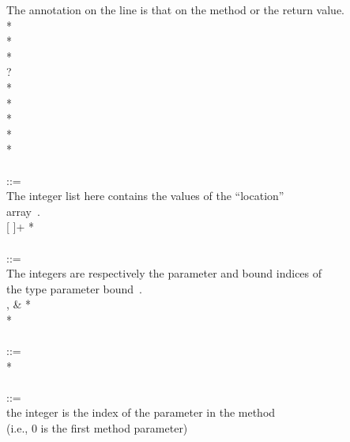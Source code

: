 \documentclass{article}
\begin{document}
\begin{tabbing}
\qquad    \bnfcmt The annotation on the  line is that on the method or the return value. \\
\qquad    {}  \bnflit{:} * \lineend \\
\qquad        {}* \\
\qquad        {}* \\
\qquad        {}? \\
\qquad        {}* \\
\qquad        {}* \\
\qquad        {}* \\
\qquad        {}* \\
\qquad        {}* \\
\\
 ::= \\
\qquad    \bnfcmt The integer list here contains the values of the ``location'' \\
\qquad    \bnfcmt array~\cite{JSR308}. \\
\qquad    {}  [ \bnflit{,}  ]+ \bnflit{:} * \lineend \\
\\
 ::= \\
\qquad    \bnfcmt The integers are respectively the parameter and bound indices of \\
\qquad    \bnfcmt the type parameter bound~\cite{JSR308}. \\
\qquad    {} , \& \bnflit{:} * \lineend \\
\qquad    {}* \\
\\
 ::=  \\
\qquad    {} * \lineend \\
\\
 ::= \\
\qquad    \bnfcmt the integer is the index of the parameter in the method \\
\qquad    \bnfcmt (i.e., 0 is the first method parameter) \\

\end{tabbing}
\end{document}
